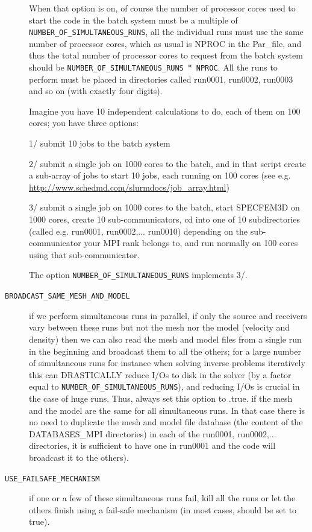 \begin{description}
When that option is on, of course the number of processor cores used to start
the code in the batch system must be a multiple of \texttt{NUMBER\_OF\_SIMULTANEOUS\_RUNS},
all the individual runs must use the same number of processor cores,
which as usual is NPROC in the Par\_file,
and thus the total number of processor cores to request from the batch system
should be \texttt{NUMBER\_OF\_SIMULTANEOUS\_RUNS}~*~\texttt{NPROC}.
All the runs to perform must be placed in directories called run0001, run0002, run0003 and so on
(with exactly four digits).

Imagine you have 10 independent calculations to do, each of them on 100 cores; you have three options:

1/ submit 10 jobs to the batch system

2/ submit a single job on 1000 cores to the batch, and in that script create a sub-array of jobs to start 10 jobs,
each running on 100 cores (see e.g. \url{http://www.schedmd.com/slurmdocs/job_array.html})

3/ submit a single job on 1000 cores to the batch, start SPECFEM3D on 1000 cores, create 10 sub-communicators,
cd into one of 10 subdirectories (called e.g. run0001, run0002,... run0010) depending on the sub-communicator
your MPI rank belongs to, and run normally on 100 cores using that sub-communicator.

The option \texttt{NUMBER\_OF\_SIMULTANEOUS\_RUNS} implements 3/.

\item [{\texttt{BROADCAST\_SAME\_MESH\_AND\_MODEL}}] if we perform simultaneous runs in parallel,
if only the source and receivers vary between these runs
but not the mesh nor the model (velocity and density) then we can also read the mesh and model files
from a single run in the beginning and broadcast them to all the others; for a large number of simultaneous
runs for instance when solving inverse problems iteratively this can DRASTICALLY reduce I/Os to disk in the solver
(by a factor equal to \texttt{NUMBER\_OF\_SIMULTANEOUS\_RUNS}), and reducing I/Os is crucial in the case of huge runs.
Thus, always set this option to .true. if the mesh and the model are the same for all simultaneous runs.
In that case there is no need to duplicate the mesh and model file database (the content of the DATABASES\_MPI
directories) in each of the run0001, run0002,... directories, it is sufficient to have one in run0001
and the code will broadcast it to the others).

\item [{\texttt{USE\_FAILSAFE\_MECHANISM}}] if one or a few of these simultaneous runs fail,
kill all the runs or let the others finish using a fail-safe mechanism
(in most cases, should be set to true).


\end{description}
